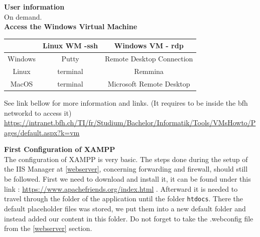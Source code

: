 \documentclass{scrbook}
\begin{document}
\textbf{User information} \\
On demand.\\

\textbf{Access the Windows Virtual Machine}\\
\begin{center}
  \begin{tabular}{|c|c|c|}
    \hline
     & Linux WM -ssh & Windows VM - rdp \\
    \hline
    Windows & Putty & Remote Desktop Connection \\
    \hline
    Linux & terminal & Remmina \\
    \hline
    MacOS & terminal & Microsoft Remote Desktop \\
    \hline
  \end{tabular}
\end{center}

See link bellow for more information and links. (It requires to be inside the bfh networkd to access it)
\url{https://intranet.bfh.ch/TI/fr/Studium/Bachelor/Informatik/Tools/VMsHowto/Pages/default.aspx?k=vm}

\textbf{First Configuration of XAMPP}\\
The configuration of XAMPP is very basic. The steps done during the setup of the IIS Manager at \ref{webserver}, concerning forwarding and firewall, should still be followed. First we need to download and install it, it can be found under this link : \url{https://www.apachefriends.org/index.html} . Afterward it is needed to travel through the folder of the application until the folder 
\texttt{htdocs}. There the default placeholder files was stored, we put them into a new default folder and instead added our content in this folder. Do not forget to take the .webconfig file from the \ref{webserver} section.
\end{document}
